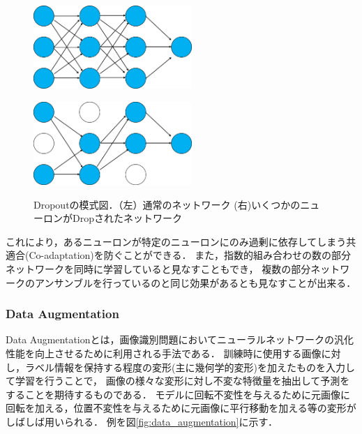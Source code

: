 \begin{figure}[tbp]
    \begin{minipage}{0.5\hsize}
     \begin{center}
      \includegraphics[width=60mm]{figures/standard_network.pdf}
     \end{center}
     \label{fig:one}
    \end{minipage}
    \begin{minipage}{0.5\hsize}
     \begin{center}
      \includegraphics[width=60mm]{figures/dropout_network.pdf}
     \end{center}
     \label{fig:two}
    \end{minipage}
    \caption{\label{fig:dropout_network}Dropoutの模式図．（左）通常のネットワーク (右)いくつかのニューロンがDropされたネットワーク}
    
\end{figure}

これにより，あるニューロンが特定のニューロンにのみ過剰に依存してしまう共適合(Co-adaptation)を防ぐことができる．
また，指数的組み合わせの数の部分ネットワークを同時に学習していると見なすこともでき，
複数の部分ネットワークのアンサンブルを行っているのと同じ効果があるとも見なすことが出来る．

\subsubsection{\textbf{Data Augmentation}}

Data Augmentationとは，画像識別問題においてニューラルネットワークの汎化性能を向上させるために利用される手法である．
訓練時に使用する画像に対し，ラベル情報を保持する程度の変形(主に幾何学的変形)を加えたものを入力して学習を行うことで，
画像の様々な変形に対し不変な特徴量を抽出して予測をすることを期待するものである．
モデルに回転不変性を与えるために元画像に回転を加える，位置不変性を与えるために元画像に平行移動を加える等の変形がしばしば用いられる．
例を図\ref{fig:data_augmentation}に示す．

